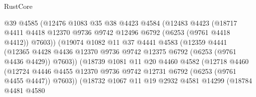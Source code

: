 \begin{lexlean}{RustCore}
\begin{coremodule}
                          @39
                          @4585
                          (@12476
                            @1083
                            @35
                            @38
                            @4423
                            @4584
                            (@12483
                              @4423
                              (@18717
                                @4411
                                @4418
                                @12370
                                @9736
                                @9742
                                @12496
                                @6792
                                (@6253 (@9761 @4418 @4412))
                                @7603))
                            (@19074
                              @1082
                              @11
                              @37
                              @4441
                              @4583
                              (@12359
                                @4441
                                (@12365
                                  @4428
                                  @4436
                                  @12370
                                  @9736
                                  @9742
                                  @12375
                                  @6792
                                  (@6253 (@9761 @4436 @4429))
                                  @7603))
                              (@18739
                                @1081
                                @11
                                @20
                                @4460
                                @4582
                                (@12718
                                  @4460
                                  (@12724
                                    @4446
                                    @4455
                                    @12370
                                    @9736
                                    @9742
                                    @12731
                                    @6792
                                    (@6253 (@9761 @4455 @4447))
                                    @7603))
                                (@18732
                                  @1067
                                  @11
                                  @19
                                  @2932
                                  @4581
                                  @14299
                                  (@18784
                                    @4481
                                    @4580

\end{coremodule}
\end{lexlean}
